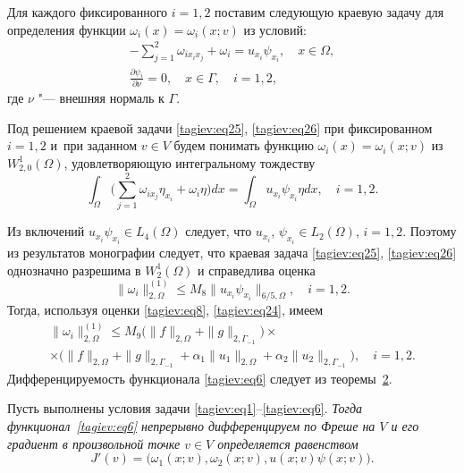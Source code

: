 Для каждого фиксированного $i = 1,2 $ поставим 
следующую краевую задачу для определения функции $\omega _i ( x   )=\omega _i ( x; v  )$ из условий:
\begin{gather}
\label{tagiev:eq25}
-\sum\limits_{j=1}^2 \omega _{ix_i x_j }  +\omega _i =u_{x_i } \psi _{x_i 
},\quad x \in \Omega,\\
\label{tagiev:eq26}
\frac{\partial \psi _i }{\partial \nu }=0,\quad x \in \Gamma, \quad i=1, 2,
\end{gather}
где $\nu $ "--- внешняя нормаль к $\Gamma $. 

Под решением краевой задачи \eqref{tagiev:eq25}, \eqref{tagiev:eq26} при фиксированном $i= 1, 2$ и~при заданном $ v  \in V$ будем понимать функцию 
$\omega _i ( x )=\omega _i ( x; v  )$ из 
$W_{2,0}^1 ( \Omega )$, удовлетворяющую интегральному тождеству
\begin{equation}
\label{tagiev:eq27}
\int _\Omega  \biggl( \sum\limits_{j=1}^2 \omega _{ix_j } \eta _{x_i 
} +\omega _i \eta \biggr) dx=\int _\Omega u_{x_i } \psi _{x_i } 
\eta dx, \quad i=1,2.
\end{equation}

Из включений $u_{x_i } \psi _{x_i } \in L_4 ( \Omega )$ следует, что $u_{x_i }$, $\psi _{x_i } \in L_2 ( 
\Omega )$, $i=1,2$.
Поэтому  из результатов  монографии  \cite[с.~200--202]{tagiev:bib15} следует, что краевая задача \eqref{tagiev:eq25}, \eqref{tagiev:eq26} однозначно  разрешима в $W_2^1 ( \Omega )$ и справедлива оценка 
\[
\| \omega _i \|_{2,\Omega }^{ ( 1 )} \le M_8 \|u_{x_i } \psi _{x_i } \|_{6/5,\Omega }, \quad i=1, 2.
\]
Тогда, используя оценки \eqref{tagiev:eq8}, \eqref{tagiev:eq24}, имеем
\begin{multline}
\label{tagiev:eq28}
\| \omega _i \|_{2,\Omega }^{ ( 1 )} \le M_9 \bigl( \| f \|_{2,\Omega } + \| g \|_{2,\Gamma_{-1}} \bigr) \times\\
\times\bigl( \| f \|_{2,\Omega } + \| g   \|_{2,\Gamma _{-1}} +\alpha _1 \| u_1 \|_{2,\Omega } +\alpha _2 \| u_2 \|_{2,\Gamma _{-1}} \bigr), \quad i=1, 2.
\end{multline}
Дифференцируемость функционала \eqref{tagiev:eq6} следует из теоремы~\hyperlink{tag:th2}{2}.


\smallskip
\hypertarget{tag:th2}{}

\begin{theorem}[2]Пусть выполнены условия задачи \rm \eqref{tagiev:eq1}--\eqref{tagiev:eq6}. \it
Тогда функционал~\eqref{tagiev:eq6} непрерывно дифференцируем по Фреше на $V$ и его 
градиент в произвольной точке $ v  \in V$ определяется равенством
\begin{equation}
\label{tagiev:eq29}
J' (  v  )= \bigl( \omega _1 (x; v ),\omega _2 ( x; v ), u (x; v )\psi (x; v  ) \bigr).
\end{equation}
\end{theorem}

